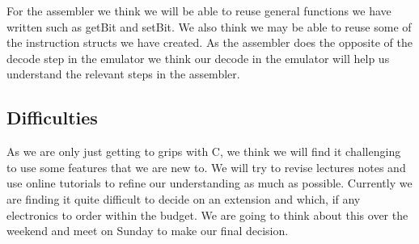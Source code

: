 \documentclass[11pt]{article}
\begin{document}
For the assembler we think we will be able to reuse general functions we have written such as getBit and setBit. We also think we may be able to reuse some of the instruction structs we have created. As the assembler does the opposite of the decode step in the emulator we think our decode in the emulator will help us understand the relevant steps in the assembler. 

\subsection{Difficulties}

As we are only just getting to grips with C, we think we will find it challenging to use some features that we are new to. We will try to revise lectures notes and use online tutorials to refine our understanding as much as possible. Currently we are finding it quite difficult to decide on an extension and which, if any electronics to order within the budget. We are going to think about this over the weekend and meet on Sunday to make our final decision. 
\end{document}
